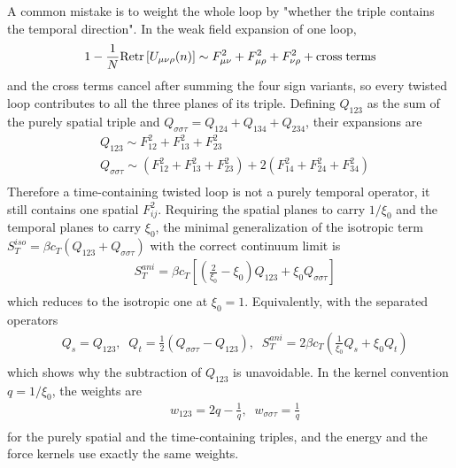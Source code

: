 A common mistake is to weight the whole loop by "whether the triple contains the temporal direction". In the weak field expansion of one loop,
\begin{equation}
\begin{split}
&1-\frac{1}{N}{\rm Re} {\rm tr} \left[U_{\mu\nu\rho}(n)\right]\sim F_{\mu\nu}^2+F_{\mu\rho}^2+F_{\nu\rho}^2+{\rm cross\;terms}\\
\end{split}
\end{equation}
and the cross terms cancel after summing the four sign variants, so every twisted loop contributes to all the three planes of its triple. Defining $Q_{123}$ as the sum of the purely spatial triple and $Q_{\sigma\sigma\tau}=Q_{124}+Q_{134}+Q_{234}$, their expansions are
\begin{equation}
\begin{split}
&Q_{123}\sim F_{12}^2+F_{13}^2+F_{23}^2\\
&Q_{\sigma\sigma\tau}\sim \left(F_{12}^2+F_{13}^2+F_{23}^2\right)+2\left(F_{14}^2+F_{24}^2+F_{34}^2\right)\\
\end{split}
\end{equation}
Therefore a time-containing twisted loop is not a purely temporal operator, it still contains one spatial $F_{ij}^2$. Requiring the spatial planes to carry $1/\xi _0$ and the temporal planes to carry $\xi _0$, the minimal generalization of the isotropic term $S_T^{iso}=\beta c_T(Q_{123}+Q_{\sigma\sigma\tau})$ with the correct continuum limit is
\begin{equation}
\begin{split}
&S_T^{ani}=\beta c_T\left[\left(\frac{2}{\xi _0}-\xi _0\right)Q_{123}+\xi _0 Q_{\sigma\sigma\tau}\right]\\
\end{split}
\end{equation}
which reduces to the isotropic one at $\xi _0=1$. Equivalently, with the separated operators
\begin{equation}
\begin{split}
&Q_s=Q_{123},\;\;Q_t=\frac{1}{2}\left(Q_{\sigma\sigma\tau}-Q_{123}\right),\;\;S_T^{ani}=2\beta c_T\left(\frac{1}{\xi _0}Q_s+\xi _0 Q_t\right)\\
\end{split}
\end{equation}
which shows why the subtraction of $Q_{123}$ is unavoidable. In the kernel convention $q=1/\xi _0$, the weights are
\begin{equation}
\begin{split}
&w_{123}=2q-\frac{1}{q},\;\;w_{\sigma\sigma\tau}=\frac{1}{q}\\
\end{split}
\end{equation}
for the purely spatial and the time-containing triples, and the energy and the force kernels use exactly the same weights.

